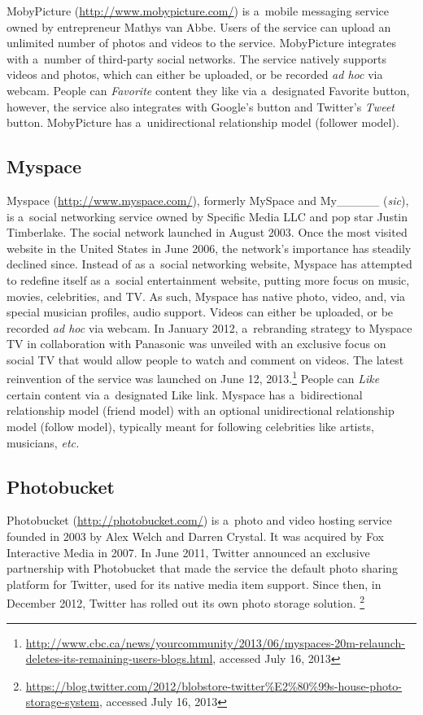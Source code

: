MobyPicture (\url{http://www.mobypicture.com/})
is a~mobile messaging service
owned by entrepreneur Mathys van Abbe.
Users of the service can upload an unlimited number of
photos and videos to the service.
MobyPicture integrates with a~number of
third-party social networks.
The service natively supports videos and photos,
which can either be uploaded, or be recorded \emph{ad hoc}
via webcam.
People can \emph{Favorite} content they like via
a~designated Favorite button,
however, the service also integrates with Google's
\emph{\plusone} button and Twitter's \emph{Tweet} button. 
MobyPicture has a~unidirectional relationship model
(follower model).

\subsection{Myspace}

Myspace (\url{http://www.myspace.com/}),
formerly MySpace and My\_\_\_\_\_ (\emph{sic}), is
a~social networking service owned by Specific Media LLC
and pop star Justin Timberlake.
The social network launched in August 2003.
Once the most visited website
in the United States in June 2006,
the network's importance has steadily declined since.
Instead of as a~social networking website,
Myspace has attempted to redefine itself
as a~social entertainment website,
putting more focus on music, movies, celebrities, and TV.
As such, Myspace has native photo, video, and,
via special musician profiles, audio support.
Videos can either be uploaded,
or be recorded \emph{ad hoc} via webcam.
In January 2012, a~rebranding strategy to Myspace TV
in collaboration with Panasonic was unveiled
with an exclusive focus on social TV that would allow people
to watch and comment on videos.
The latest reinvention of the service was launched on June 12, 2013.\footnote{\url{http://www.cbc.ca/news/yourcommunity/2013/06/myspaces-20m-relaunch-deletes-its-remaining-users-blogs.html},
accessed July 16, 2013}
People can \emph{Like} certain content via a~designated Like link.
Myspace has a~bidirectional relationship model (friend model)
with an optional unidirectional relationship model (follow model),
typically meant for following celebrities like artists,
musicians, \emph{etc.}

\subsection{Photobucket}

Photobucket (\url{http://photobucket.com/})
is a~photo and video hosting service
founded in 2003 by Alex Welch and Darren Crystal.
It was acquired by Fox Interactive Media in 2007.
In June 2011, Twitter announced an exclusive partnership
with Photobucket that made the service
the default photo sharing platform for Twitter,
used for its native media item support.
Since then, in December 2012,
Twitter has rolled out its own photo storage solution.%
\footnote{\url{https://blog.twitter.com/2012/blobstore-twitter%E2%80%99s-house-photo-storage-system}, accessed July 16, 2013}

